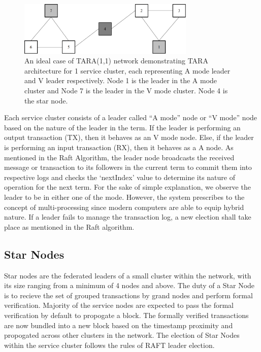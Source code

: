 \documentclass[]{article}
\begin{document}
\begin{figure}[h]
	\centering
	\includegraphics[width=0.75\textwidth]{TARA(1,1).png}
	\caption{An ideal case of TARA(1,1) network demonstrating TARA architecture for 1 service cluster, each representing A mode leader and V leader respectively. Node 1 is the leader in the A mode cluster and Node 7 is the leader in the V mode cluster. Node 4 is the star node.}
	\label{fig:service-cluster}
\end{figure}

Each service cluster consists of a leader called “A mode” node or “V mode” node based on the nature of the leader in the term. If the leader is performing an output transaction (TX), then it behaves as an V mode node. Else, if the leader is performing an input transaction (RX), then it behaves as a A node. As mentioned in the Raft Algorithm\cite{ARTICLE:2}, the leader node broadcasts the received message or transaction to its followers in the current term to commit them into respective logs and checks the ‘nextIndex’ value to determine its nature of operation for the next term. 
For the sake of simple explanation, we observe the leader to be in either one of the mode. However, the system prescribes to the concept of multi-processing since modern computers are able to equip hybrid nature. If a leader fails to manage the transaction log, a new election shall take place as mentioned in the Raft algorithm\cite{ARTICLE:2}.

\subsection{Star Nodes}
Star nodes are the federated leaders of a small cluster within the network, with its size ranging from a minimum of 4 nodes and above.
The duty of a Star Node is to recieve the set of grouped transactions by grand nodes and perform formal verification.
Majority of the service nodes are expected to pass the formal verification by default to propogate a block. The formally verified transactions are now bundled into a new block based on the timestamp proximity and propogated across other clusters in the network.
The election of Star Nodes within the service cluster follows the rules of RAFT leader election.
\end{document}
